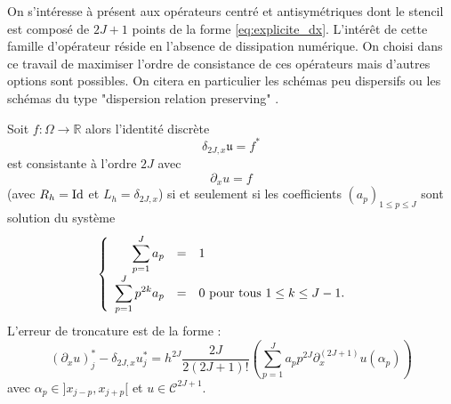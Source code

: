 On s'intéresse à présent aux opérateurs centré et antisymétriques dont le stencil est composé de $2J+1$ points de la forme \eqref{eq:explicite_dx}. L'intérêt de cette famille d'opérateur réside en l'absence de dissipation numérique. On choisi dans ce travail de maximiser l'ordre de consistance de ces opérateurs mais d'autres options sont possibles. On citera en particulier les schémas peu dispersifs \cite{Bogey2004} ou les schémas du type "dispersion relation preserving" \cite{Tam1993}.

\begin{theoreme}
Soit $f : \Omega \rightarrow \mathbb{R}$ alors l'identité discrète
\begin{equation}
\delta_{2J,x} \mathfrak{u} = f^*
\end{equation}
est consistante à l'ordre $2J$ avec 
\begin{equation}
\partial_x u = f
\end{equation}
(avec $R_h = \text{Id}$ et $L_h = \delta_{2J,x}$) si et seulement si les coefficients $(a_p)_{1 \leq p \leq J}$ sont solution du système
\begin{equation}
\left\lbrace
\begin{array}{rcll}
\displaystyle\sum\limits_{p=1}^J a_p & = & 1 & \\
\displaystyle\sum\limits_{p=1}^J p^{2k} a_p & = & 0 \text{ pour tous } 1 \leq k \leq J-1.
\end{array}
\right.
\label{eq:syst_opexplicite_P}
\end{equation}
L'erreur de troncature est de la forme :
\begin{equation}
\left(\partial_x u \right)_j^* - \delta_{2J,x} u^*_j = h^{2J}  \dfrac{2J}{2(2J+1)!}   \left(  \sum_{p=1}^J a_p p^{2J} \partial^{(2J+1)}_x u(\alpha_p) \right)
\end{equation} 
avec $\alpha_p \in ]x_{j-p}, x_{j+p}[$ et $u \in \mathcal{C}^{2J+1}$.
\label{th:consistance_delta_x_explicite}
\end{theoreme}


